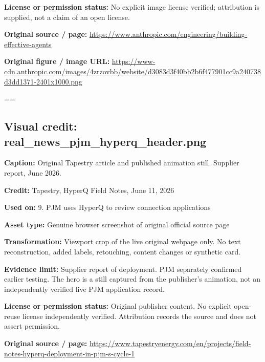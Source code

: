 \documentclass[10pt,letterpaper]{article}
\begin{document}
\textbf{License or permission status:} No explicit image license verified; attribution is supplied, not a claim of an open license.\par
\textbf{Original source / page:} \href{https://www.anthropic.com/engineering/building-effective-agents}{\small\ttfamily https:/\allowbreak{}/\allowbreak{}www.\allowbreak{}anthropic.\allowbreak{}com/\allowbreak{}engineering/\allowbreak{}building-\allowbreak{}effective-\allowbreak{}agents}\par
\textbf{Original figure / image URL:} \href{https://www-cdn.anthropic.com/images/4zrzovbb/website/d3083d3f40bb2b6f477901cc9a240738d3dd1371-2401x1000.png}{\small\ttfamily https:/\allowbreak{}/\allowbreak{}www-\allowbreak{}cdn.\allowbreak{}anthropic.\allowbreak{}com/\allowbreak{}images/\allowbreak{}4zrzovbb/\allowbreak{}website/\allowbreak{}d3083d3f40bb2b6f477901cc9a240738d3dd1371-\allowbreak{}2401x1000.\allowbreak{}png}\par
\egroup\par\noindent\box\readingEntry\par\medskip
\setbox\readingEntry=\vbox\bgroup\hsize=\linewidth\subsection*{Visual credit: real\_news\_pjm\_hyperq\_header.png}
\textbf{Caption:} Original Tapestry article and published animation still. Supplier report, June 2026.\par
\textbf{Credit:} Tapestry, HyperQ Field Notes, June 11, 2026\par
\textbf{Used on:} 9. PJM uses HyperQ to review connection applications\par
\textbf{Asset type:} Genuine browser screenshot of original official source page\par
\textbf{Transformation:} Viewport crop of the live original webpage only. No text reconstruction, added labels, retouching, content changes or synthetic card.\par
\textbf{Evidence limit:} Supplier report of deployment. PJM separately confirmed earlier testing. The hero is a still captured from the publisher's animation, not an independently verified live PJM application record.\par
\textbf{License or permission status:} Original publisher content. No explicit open-reuse license independently verified. Attribution records the source and does not assert permission.\par
\textbf{Original source / page:} \href{https://www.tapestryenergy.com/en/projects/field-notes-hyperq-deployment-in-pjm-s-cycle-1}{\small\ttfamily https:/\allowbreak{}/\allowbreak{}www.\allowbreak{}tapestryenergy.\allowbreak{}com/\allowbreak{}en/\allowbreak{}projects/\allowbreak{}field-\allowbreak{}notes-\allowbreak{}hyperq-\allowbreak{}deployment-\allowbreak{}in-\allowbreak{}pjm-\allowbreak{}s-\allowbreak{}cycle-\allowbreak{}1}\par
\end{document}
